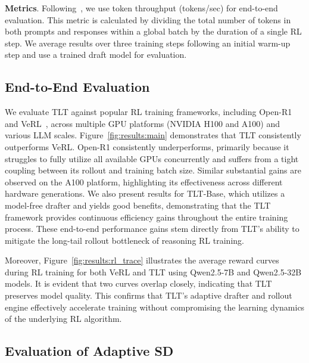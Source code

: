 \documentclass[sigplan,screen]{acmart}
\newcommand{\SysName}{\textrm{TLT}\xspace}
\begin{document}
\noindent\textbf{Metrics}.
Following~\cite{HybridFlow}, we use token throughput (tokens/sec) for end-to-end evaluation. This metric is calculated by dividing the total number of tokens in both prompts and responses within a global batch by the duration of a single RL step. We average results over three training steps following an initial warm-up step and use a trained draft model for evaluation.
 

\subsection{End-to-End Evaluation}
\label{subsec_end2end}

We evaluate \SysName against popular RL training frameworks, including Open-R1~\cite{openr1} and  VeRL~\cite{HybridFlow}, across multiple GPU platforms (NVIDIA H100 and A100) and various LLM scales.  Figure~\ref{fig:results:main} demonstrates that \SysName consistently outperforms VeRL. Open-R1 consistently underperforms, primarily because it struggles to fully utilize all available GPUs concurrently and suffers from a tight coupling between its rollout and training batch size. Similar substantial gains are observed on the A100 platform, highlighting its effectiveness across different hardware generations. We also present results for \SysName-Base, which utilizes a model-free drafter and yields good benefits, demonstrating that the \SysName framework provides continuous efficiency gains throughout the entire training process. These end-to-end performance gains stem directly from \SysName's ability to mitigate the long-tail rollout bottleneck of reasoning RL training.


Moreover, Figure~\ref{fig:results:rl_trace} illustrates the average reward curves during RL training for both VeRL and \SysName using Qwen2.5-7B and Qwen2.5-32B models. It is evident that two curves overlap closely, indicating that \SysName preserves model quality. This confirms that \SysName's adaptive drafter and rollout engine effectively accelerate training without compromising the learning dynamics of the underlying RL algorithm.

\vspace{-10pt}
\subsection{Evaluation of Adaptive SD} 
\label{subsec_ablation}
\end{document}
